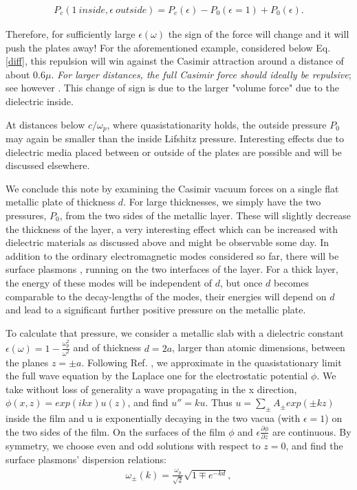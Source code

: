 \documentclass[prl,nofootinbib,twocolumn,showpacs]{revtex4}
\def\bq{\begin{eqnarray}}
\def\ee{\end{eqnarray}}
\begin{document}
\bq P_c (1~inside, \epsilon~outside)= P_c(\epsilon) - P_0(\epsilon = 1)  + P_0(\epsilon).
\ee


\noindent Therefore, for sufficiently large $\epsilon(\omega)$ the sign of the force will change
and it will  push the plates away! For the aforementioned example, considered below Eq.
\ref{diff}, this repulsion will win against the Casimir attraction around a distance of
about $0.6 \mu$. {\em For larger distances, the full Casimir force should ideally be repulsive}; see however \cite {el}.
This change of sign is due to the larger "volume force" due to the dielectric inside.

At distances below $c/\omega_p$, where quasistationarity holds, the outside pressure
$P_0$ may again be smaller than the inside Lifshitz pressure. Interesting effects due to
dielectric media placed between or outside of the plates are possible and will be
discussed elsewhere.

We conclude this note by examining the Casimir vacuum forces on a single flat metallic
plate of thickness $d$. For large thicknesses, we simply have the two  pressures, $P_0$,
from  the two sides of the metallic layer. These will slightly decrease the thickness of
the layer, a very interesting effect which can be increased with dielectric materials as
discussed above and might be observable some day. In addition to the ordinary
electromagnetic modes considered so far, there will be surface plasmons
\cite{Stern-Ferrel,Raether},\cite{Lifshitz,Dzy,van Kampen} running on the two interfaces
of the layer. For a thick layer, the energy of these modes  will be independent of $d$,
but once $d$ becomes comparable to the decay-lengths of the modes, their energies will
depend on $d$ and lead to a significant further positive pressure on the metallic plate.

To calculate that pressure, we consider a metallic slab with a dielectric constant
$\epsilon(\omega) = 1 - \frac{\omega_p^2}{\omega^2}$ and  of thickness $d = 2a$, larger
than atomic dimensions, between
the planes $z = \pm a$. Following Ref. \cite{van Kampen}, we approximate  in the
quasistationary limit the full wave equation by the Laplace one for the electrostatic
potential $\phi$. We take without loss of generality a wave propagating in the x
direction, $\phi(x,z) =  exp(ikx)u(z)$, and find $u'' = k u$. Thus $u = \sum_\pm A_{\pm}
exp( \pm kz)$ inside the film and u is exponentially decaying in the two vacua (with
$\epsilon = 1$) on the two sides of the film. On the surfaces of the film $\phi$ and
$\epsilon \frac{\partial \phi}{\partial z}$ are continuous. By symmetry, we choose even
and odd solutions with respect to $z = 0$, and find the surface plasmons' dispersion
relations: \bq \omega_{\pm}(k) = \frac{\omega_p}{\sqrt{2}}\sqrt{1 \mp e^{-kd}}, \ee
\end{document}

